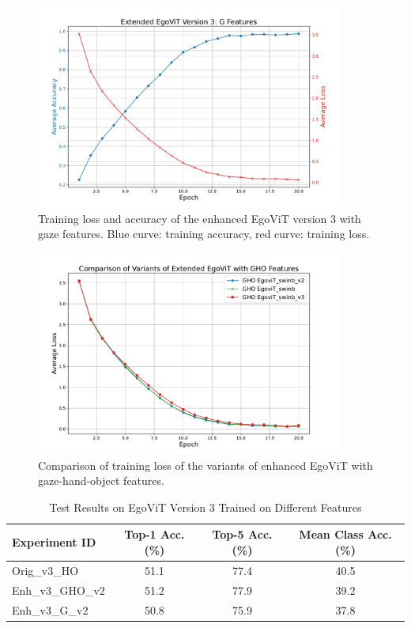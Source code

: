 \begin{figure}
    \centering
    \includegraphics[width=0.9\textwidth]{graphics/figure9}
    \caption{Training loss and accuracy of the enhanced EgoViT version 3 with gaze features. Blue curve: training accuracy, red curve: training loss.}
    \label{fig:egovit_v3_G}
\end{figure}
\clearpage
\begin{figure}[htbp]
    \centering
    \includegraphics[width=0.9\textwidth]{graphics/loss}
    \caption{Comparison of training loss of the variants of enhanced EgoViT with gaze-hand-object features.}
    \label{fig:loss_comparison}
\end{figure}
\begin{table}[htbp]
    \centering
    \caption{Test Results on EgoViT Version 3 Trained on Different Features}
    \begin{tabular}{lccc}
    \hline\hline
    Experiment ID & Top-1 Acc.(\%)& Top-5 Acc.(\%)& Mean Class Acc.(\%) \\
    \hline
    Orig\_v3\_HO & 51.1 & 77.4 & 40.5 \\
    Enh\_v3\_GHO\_v2 & 51.2 & 77.9 & 39.2 \\
    Enh\_v3\_G\_v2   & 50.8 & 75.9 & 37.8 \\
    \hline\hline
    \end{tabular}
    \label{tab:Results_table5}
\end{table}

